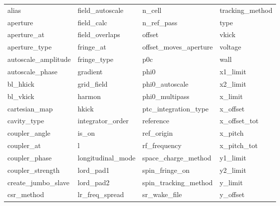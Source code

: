  \begin{tabular}{llll} \toprule
alias                       & field_autoscale             & n_cell                      & tracking_method             \\
aperture                    & field_calc                  & n_ref_pass                  & type                        \\
aperture_at                 & field_overlaps              & offset                      & vkick                       \\
aperture_type               & fringe_at                   & offset_moves_aperture       & voltage                     \\
autoscale_amplitude         & fringe_type                 & p0c                         & wall                        \\
autoscale_phase             & gradient                    & phi0                        & x1_limit                    \\
bl_hkick                    & grid_field                  & phi0_autoscale              & x2_limit                    \\
bl_vkick                    & harmon                      & phi0_multipass              & x_limit                     \\
cartesian_map               & hkick                       & ptc_integration_type        & x_offset                    \\
cavity_type                 & integrator_order            & reference                   & x_offset_tot                \\
coupler_angle               & is_on                       & ref_origin                  & x_pitch                     \\
coupler_at                  & l                           & rf_frequency                & x_pitch_tot                 \\
coupler_phase               & longitudinal_mode           & space_charge_method         & y1_limit                    \\
coupler_strength            & lord_pad1                   & spin_fringe_on              & y2_limit                    \\
create_jumbo_slave          & lord_pad2                   & spin_tracking_method        & y_limit                     \\
csr_method                  & lr_freq_spread              & sr_wake_file                & y_offset                    \\

\end{tabular}
